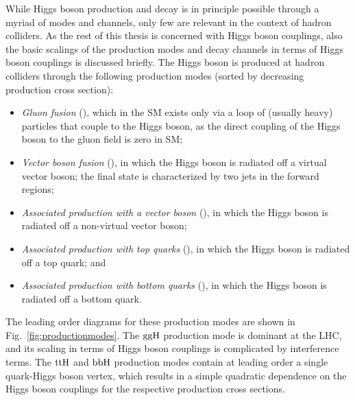 While Higgs boson production and decay is in principle possible through a myriad of modes and channels, only few are relevant in the context of hadron colliders.
% 
As the rest of this thesis is concerned with Higgs boson couplings, also the basic scalings of the production modes and decay channels in terms of Higgs boson couplings is discussed briefly.
% 
The Higgs boson is produced at hadron colliders through the following production modes (sorted by decreasing production cross section):
% 
\begin{itemize}
\item \textit{Gluon fusion} (\ggh), which in the SM exists only via a loop of (usually heavy) particles that couple to the Higgs boson, as the direct coupling of the Higgs boson to the gluon field is zero in SM;
% 
\item \textit{Vector boson fusion} (\vbf), in which the Higgs boson is radiated off a virtual vector boson; the final state is characterized by two jets in the forward regions;
% 
\item \textit{Associated production with a vector boson} (\vh), in which the Higgs boson is radiated off a non-virtual vector boson;
% 
\item \textit{Associated production with top quarks} (\tth), in which the Higgs boson is radiated off a top quark; and
% 
\item \textit{Associated production with bottom quarks} (\bbh), in which the Higgs boson is radiated off a bottom quark.
\end{itemize}
% 
The leading order diagrams for these production modes are shown in Fig.~\ref{fig:productionmodes}.
% 
The $\mathrm{g}\mathrm{g}\mathrm{H}$ production mode is dominant at the LHC, and its scaling in terms of Higgs boson couplings is complicated by interference terms.
% 
The $\mathrm{t}\mathrm{t}\mathrm{H}$ and $\mathrm{b}\mathrm{b}\mathrm{H}$ production modes contain at leading order a single quark-Higgs boson vertex, which results in a simple quadratic dependence on the Higgs boson couplings for the respective production cross sections.


